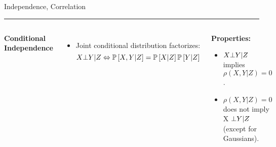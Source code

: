 \begin{frame}{Independence, Correlation}
\hrule
\begin{columns}
\textbf{Conditional Independence}
\begin{itemize}
    \item Joint conditional distribution factorizes:
    \begin{equation}
       X \indep Y | Z \Leftrightarrow \Pb[X,Y|Z] = \Pb[X|Z] \Pb[Y|Z]
    \end{equation}
\end{itemize}
\hfill\vrule\hfill
{}
\begin{center}
\textbf{Properties:}
\begin{itemize}
    \item $X \bot Y | Z$ implies $\rho(X,Y|Z) = 0$.
    \item $\rho(X,Y|Z) = 0$ does not imply X $\bot Y|Z$ (except for Gaussians). 
\end{itemize}
\end{center}
\end{columns}
\end{frame}

